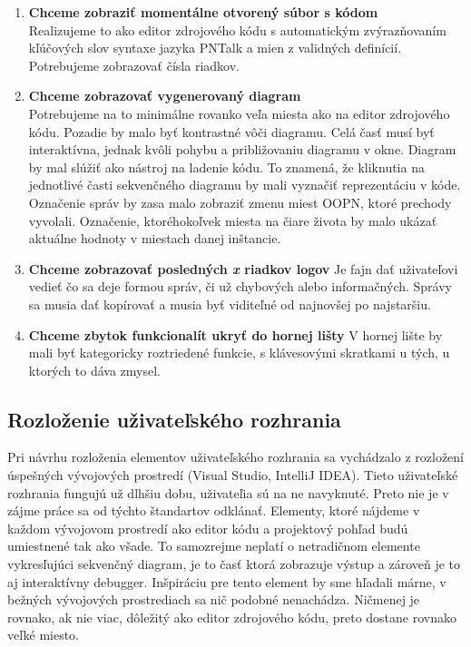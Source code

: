 \begin{enumerate}
	\item \textbf{Chceme zobraziť momentálne otvorený súbor s kódom} \\
	Realizujeme to ako editor zdrojového kódu s automatickým zvýrazňovaním kľúčových slov syntaxe jazyka PNTalk a mien z validných definícií. Potrebujeme zobrazovať čísla riadkov.
	\item \textbf{Chceme zobrazovať vygenerovaný diagram} \\
	Potrebujeme na to minimálne rovanko veľa miesta ako na editor zdrojového kódu. Pozadie by malo byť kontrastné vôči diagramu. Celá časť musí byť interaktívna, jednak kvôli pohybu a približovaniu diagramu v okne. Diagram by mal slúžiť ako nástroj na ladenie kódu. To znamená, že kliknutia na jednotlivé časti sekvenčného diagramu by mali vyznačiť reprezentáciu v kóde. Označenie správ by zasa malo zobraziť zmenu miest OOPN, ktoré prechody vyvolali. Označenie, ktoréhokoľvek miesta na čiare života by malo ukázať aktuálne hodnoty v miestach danej inštancie.
	\item \textbf{Chceme zobrazovať posledných \textit{x} riadkov logov}
	Je fajn dať uživateľovi vedieť čo sa deje formou správ, či už chybových alebo informačných. Správy sa musia dať kopírovať a musia byť viditeľné od najnovšej po najstaršiu.
	\item \textbf{Chceme zbytok funkcionalít ukryť do hornej lišty}
	V hornej lište by mali byť kategoricky roztriedené funkcie, s klávesovými skratkami u tých, u ktorých to dáva zmysel.
\end{enumerate}

\subsection{Rozloženie uživateľského rozhrania}

Pri návrhu rozloženia elementov uživateľského rozhrania sa vychádzalo z rozložení úspešných vývojových prostredí (Visual Studio, IntelliJ IDEA). Tieto uživateľské rozhrania fungujú už dlhšiu dobu, uživateľia sú na ne navyknuté. Preto nie je v zájme práce sa od týchto štandartov odklánať. Elementy, ktoré nájdeme v každom vývojovom prostredí ako editor kódu a projektový pohľad budú umiestnené tak ako všade.
To samozrejme neplatí o netradičnom elemente vykresľujúci sekvenčný diagram, je to časť ktorá zobrazuje výstup a zároveň je to aj interaktívny debugger. Inšpiráciu pre tento element by sme hľadali márne, v bežných vývojových prostrediach sa nič podobné nenachádza.
Ničmenej je rovnako, ak nie viac, dôležitý ako editor zdrojového kódu, preto dostane rovnako veľké miesto. \\

